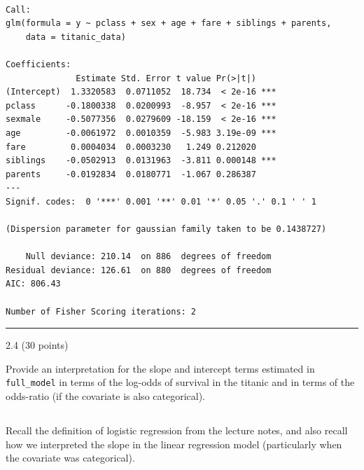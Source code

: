\documentclass[
  letterpaper,
  DIV=11,
  numbers=noendperiod]{scrartcl}
\begin{document}
\begin{verbatim}

Call:
glm(formula = y ~ pclass + sex + age + fare + siblings + parents, 
    data = titanic_data)

Coefficients:
              Estimate Std. Error t value Pr(>|t|)    
(Intercept)  1.3320583  0.0711052  18.734  < 2e-16 ***
pclass      -0.1800338  0.0200993  -8.957  < 2e-16 ***
sexmale     -0.5077356  0.0279609 -18.159  < 2e-16 ***
age         -0.0061972  0.0010359  -5.983 3.19e-09 ***
fare         0.0004034  0.0003230   1.249 0.212020    
siblings    -0.0502913  0.0131963  -3.811 0.000148 ***
parents     -0.0192834  0.0180771  -1.067 0.286387    
---
Signif. codes:  0 '***' 0.001 '**' 0.01 '*' 0.05 '.' 0.1 ' ' 1

(Dispersion parameter for gaussian family taken to be 0.1438727)

    Null deviance: 210.14  on 886  degrees of freedom
Residual deviance: 126.61  on 880  degrees of freedom
AIC: 806.43

Number of Fisher Scoring iterations: 2
\end{verbatim}

\begin{center}\rule{0.5\linewidth}{0.5pt}\end{center}

2.4 (30 points)

Provide an interpretation for the slope and intercept terms estimated in
\texttt{full\_model} in terms of the log-odds of survival in the titanic
and in terms of the odds-ratio (if the covariate is also categorical).

\hypertarget{section}{%
\subsection{}\label{section}}

Recall the definition of logistic regression from the lecture notes, and
also recall how we interpreted the slope in the linear regression model
(particularly when the covariate was categorical).
\end{document}
